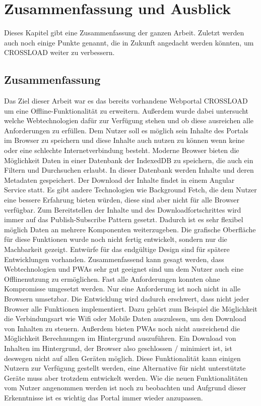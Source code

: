 \chapter{Zusammenfassung und Ausblick}
\label{Kap7}
Dieses Kapitel gibt eine Zusammenfassung der ganzen Arbeit. Zuletzt werden auch noch einige Punkte genannt, die in Zukunft angedacht werden könnten, um CROSSLOAD weiter zu verbessern.

\section{Zusammenfassung}
Das Ziel dieser Arbeit war es das bereits vorhandene Webportal CROSSLOAD um eine Offline-Funktionalität zu erweitern. Außerdem wurde dabei untersucht welche Webtechnologien dafür zur Verfügung stehen und ob diese ausreichen alle Anforderungen zu erfüllen. Dem Nutzer soll es möglich sein Inhalte des Portals im Browser zu speichern und diese Inhalte auch nutzen zu können wenn keine oder eine schlechte Internetverbindung besteht. Moderne Browser bieten die Möglichkeit Daten in einer Datenbank der IndexedDB zu speichern, die auch ein Filtern und Durchsuchen erlaubt. In dieser Datenbank werden Inhalte und deren Metadaten gespeichert. Der Download der Inhalte findet in einem Angular Service statt. Es gibt andere Technologien wie Background Fetch, die dem Nutzer eine bessere Erfahrung bieten würden, diese sind aber nicht für alle Browser verfügbar. Zum Bereitstellen der Inhalte und des Downloadfortschrittes wird immer auf das Publish-Subscribe Pattern gesetzt. Dadurch ist es sehr flexibel möglich Daten an mehrere Komponenten weiterzugeben. Die grafische Oberfläche für diese Funktionen wurde noch nicht fertig entwickelt, sondern nur die Machbarkeit gezeigt. Entwürfe für das endgültige Design sind für spätere Entwicklungen vorhanden. Zusammenfassend kann gesagt werden, dass Webtechnologien und \acp{PWA} sehr gut geeignet sind um dem Nutzer auch eine Offlinenutzung zu ermöglichen. Fast alle Anforderungen konnten ohne Kompromisse umgesetzt werden. Nur eine Anforderung ist noch nicht in alle Browsern umsetzbar. Die Entwicklung wird dadurch erschwert, dass nicht jeder Browser alle Funktionen implementiert. Dazu gehört zum Beispiel die Möglichkeit die Verbindungsart wie Wifi oder Mobile Daten auszulesen, um den Download von Inhalten zu steuern. Außerdem bieten \acp{PWA} noch nicht ausreichend die Möglichkeit Berechnungen im Hintergrund auszuführen. Ein Download von Inhalten im Hintergrund, der Browser also geschlossen / minimiert ist, ist deswegen nicht auf allen Geräten möglich. Diese Funktionalität kann einigen Nutzern zur Verfügung gestellt werden, eine Alternative für nicht unterstützte Geräte muss aber trotzdem entwickelt werden. Wie die neuen Funktionalitäten vom Nutzer angenommen werden ist noch zu beobachten und Aufgrund dieser Erkenntnisse ist es wichtig das Portal immer wieder anzupassen.

